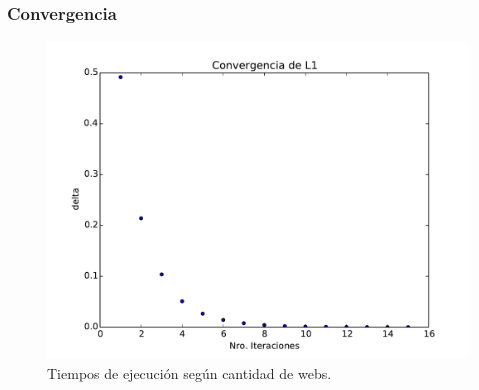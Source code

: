 \subsubsection{Convergencia}

\begin{figure}[H]
\centering
\includegraphics[scale=0.7]{images/conv_2265.pdf}
\caption{Tiempos de ejecución según cantidad de webs.}
\label{timePageRank}
\end{figure}